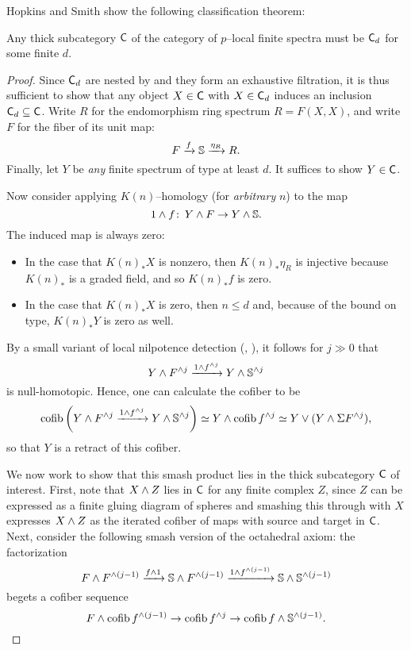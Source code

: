 Hopkins and Smith show the following classification theorem:

\begin{theorem}
Any thick subcategory $\CatOf C$ of the category of $p$--local finite spectra must be $\CatOf C_d$ for some finite $d$.
\end{theorem}
\begin{proof}
Since $\CatOf C_d$ are nested by  and they form an exhaustive filtration, it is thus sufficient to show that any object $X \in \CatOf C$ with $X \in \CatOf C_d$ induces an inclusion $\CatOf C_d \subseteq \CatOf C$.  Write $R$ for the endomorphism ring spectrum $R = F(X, X)$, and write $F$ for the fiber of its unit map: \[F \xrightarrow{f} \S \xrightarrow{\eta_R} R.\]  Finally, let $Y$ be \emph{any} finite spectrum of type at least $d$.  It suffices to show $Y\in \CatOf C$.  

Now consider applying $K(n)$--homology (for \emph{arbitrary} $n$) to the map \[1 \sm f\co Y \sm F \to Y \sm \S.\]  The induced map is always zero:
\begin{itemize}
\item In the case that $K(n)_* X$ is nonzero, then $K(n)_* \eta_R$ is injective because $K(n)_*$ is a graded field, and so $K(n)_* f$ is zero.
\item In the case that $K(n)_* X$ is zero, then $n \le d$ and, because of the bound on type, $K(n)_* Y$ is zero as well.
\end{itemize}
By a small variant of local nilpotence detection (, \cite[Corollary 2.5]{HopkinsSmith}), it follows for $j \gg 0$ that \[Y \sm F^{\sm j} \xrightarrow{1 \sm f^{\sm j}} Y \sm \S^{\sm j}\] is null-homotopic.  Hence, one can calculate the cofiber to be \[\operatorname{cofib}\left( Y \sm F^{\sm j} \xrightarrow{1 \sm f^{\sm j}} Y \sm \S^{\sm j} \right) \simeq Y \sm \operatorname{cofib} f^{\sm j} \simeq Y \vee (Y \sm \Susp F^{\sm j}),\] so that $Y$ is a retract of this cofiber.

We now work to show that this smash product lies in the thick subcategory $\CatOf C$ of interest.  First, note that $X \sm Z$ lies in $\CatOf C$ for any finite complex $Z$, since $Z$ can be expressed as a finite gluing diagram of spheres and smashing this through with $X$ expresses $X \sm Z$ as the iterated cofiber of maps with source and target in $\CatOf C$.  Next, consider the following smash version of the octahedral axiom: the factorization \[F \sm F^{\sm (j-1)} \xrightarrow{f \sm 1} \S \sm F^{\sm (j-1)} \xrightarrow{1 \sm f^{\sm (j-1)}} \S \sm \S^{\sm (j-1)}\] begets a cofiber sequence \[F \sm \operatorname{cofib} f^{\sm (j-1)} \to \operatorname{cofib} f^{\sm j} \to \operatorname{cofib} f \sm \S^{\sm (j-1)}.\]


\end{proof}
